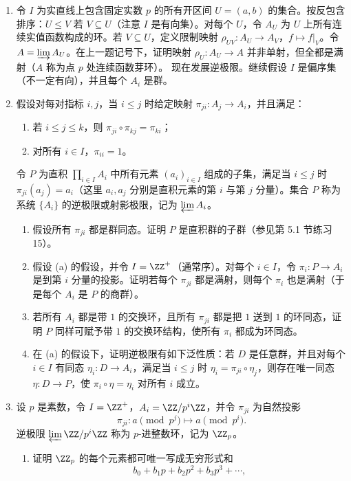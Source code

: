 \begin{enumerate}[label=\arabic*.]
	\item 令 $I$ 为实直线上包含固定实数 $p$ 的所有开区间 $U=(a,b)$ 的集合。按反包含排序：$U\leq V$ 若 $V\subseteq U$（注意 $I$ 是有向集）。对每个 $U$，令 $A_U$ 为 $U$ 上所有连续实值函数构成的环。若 $V\subseteq U$，定义限制映射 $\rho_{UV}:A_U\to A_V$，$f\mapsto f|_V$。令 $A=\varinjlim A_U$。在上一题记号下，证明映射 $\rho_U:A_U\to A$ 并非单射，但全都是满射（$A$ 称为点 $p$ 处连续函数芽环）。
	现在发展逆极限。继续假设 $I$ 是偏序集（不一定有向），并且每个 $A_i$ 是群。
	\item 假设对每对指标 $i,j$，当 $i\leq j$ 时给定映射 $\pi_{ji}:A_j\to A_i$，并且满足：
	\begin{enumerate}[label=(\roman*)]
		\item 若 $i\leq j\leq k$，则 $\pi_{ji}\circ\pi_{kj}=\pi_{ki}$；
		\item 对所有 $i\in I$，$\pi_{ii}=1$。
	\end{enumerate}
	令 $P$ 为直积 $\prod_{i\in I}A_i$ 中所有元素 $(a_i)_{i\in I}$ 组成的子集，满足当 $i\leq j$ 时 $\pi_{ji}(a_j)=a_i$（这里 $a_i,a_j$ 分别是直积元素的第 $i$ 与第 $j$ 分量）。集合 $P$ 称为系统 $\{A_i\}$ 的逆极限或射影极限，记为 $\varprojlim A_i$。
	\begin{enumerate}[label=(\alph*)]
		\item 假设所有 $\pi_{ji}$ 都是群同态。证明 $P$ 是直积群的子群（参见第 5.1 节练习 15）。
		\item 假设 (a) 的假设，并令 $I=\ZZ^+$（通常序）。对每个 $i\in I$，令 $\pi_i:P\to A_i$ 是到第 $i$ 分量的投影。证明若每个 $\pi_{ji}$ 都是满射，则每个 $\pi_i$ 也是满射（于是每个 $A_i$ 是 $P$ 的商群）。
		\item 若所有 $A_i$ 都是带 $1$ 的交换环，且所有 $\pi_{ji}$ 都是把 $1$ 送到 $1$ 的环同态，证明 $P$ 同样可赋予带 $1$ 的交换环结构，使所有 $\pi_i$ 都成为环同态。
		\item 在 (a) 的假设下，证明逆极限有如下泛性质：若 $D$ 是任意群，并且对每个 $i\in I$ 有同态 $\eta_i:D\to A_i$，满足当 $i\leq j$ 时 $\eta_i=\pi_{ji}\circ\eta_j$，则存在唯一同态 $\eta:D\to P$，使 $\pi_i\circ\eta=\eta_i$ 对所有 $i$ 成立。
	\end{enumerate}
	\item 设 $p$ 是素数，令 $I=\ZZ^+$，$A_i=\ZZ/p^i\ZZ$，并令 $\pi_{ji}$ 为自然投影
	\[
	\pi_{ji}:a\pmod {p^j}\longmapsto a\pmod {p^i}.
	\]
	逆极限 $\varprojlim \ZZ/p^i\ZZ$ 称为 $p$-进整数环，记为 $\ZZ_p$。
	\begin{enumerate}[label=(\alph*)]
		\item 证明 $\ZZ_p$ 的每个元素都可唯一写成无穷形式和
		\[
		b_0+b_1p+b_2p^2+b_3p^3+\cdots,
\]
\end{enumerate}
\end{enumerate}
